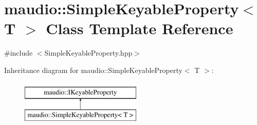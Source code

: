 \hypertarget{classmaudio_1_1SimpleKeyableProperty}{\section{maudio\-:\-:Simple\-Keyable\-Property$<$ T $>$ Class Template Reference}
\label{classmaudio_1_1SimpleKeyableProperty}
}


{\ttfamily \#include $<$Simple\-Keyable\-Property.\-hpp$>$}

Inheritance diagram for maudio\-:\-:Simple\-Keyable\-Property$<$ T $>$\-:\begin{figure}[H]
\begin{center}
\leavevmode
\includegraphics[height=2.000000cm]{classmaudio_1_1SimpleKeyableProperty}
\end{center}
\end{figure}
